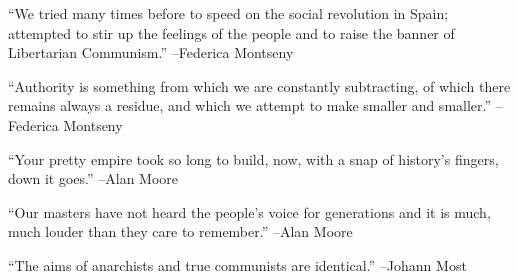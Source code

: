 \documentclass{article}%
\begin{document}
\begin{minipage}{\textwidth}%
\flushleft%
“We tried many times before to speed on the social revolution in Spain; attempted to stir up the feelings of the people and to raise the banner of Libertarian Communism.”%
\linebreak%
\vspace{1mm}%
–Federica Montseny%
\linebreak%
\vspace{1mm}%
\end{minipage}%
\linebreak%
\vspace{1mm}%
\begin{minipage}{\textwidth}%
\flushleft%
“Authority is something from which we are constantly subtracting, of which there remains always a residue, and which we attempt to make smaller and smaller.”%
\linebreak%
\vspace{1mm}%
–Federica Montseny%
\linebreak%
\vspace{1mm}%
\end{minipage}%
\linebreak%
\vspace{1mm}%
\begin{minipage}{\textwidth}%
\flushleft%
“Your pretty empire took so long to build, now, with a snap of history's fingers, down it goes.”%
\linebreak%
\vspace{1mm}%
–Alan Moore%
\linebreak%
\vspace{1mm}%
\end{minipage}%
\linebreak%
\vspace{1mm}%
\begin{minipage}{\textwidth}%
\flushleft%
“Our masters have not heard the people's voice for generations and it is much, much louder than they care to remember.”%
\linebreak%
\vspace{1mm}%
–Alan Moore%
\linebreak%
\vspace{1mm}%
\end{minipage}%
\linebreak%
\vspace{1mm}%
\begin{minipage}{\textwidth}%
\flushleft%
“The aims of anarchists and true communists are identical.”%
\linebreak%
\vspace{1mm}%
–Johann Most%
\linebreak%
\vspace{1mm}%
\end{minipage}%
\end{document}
